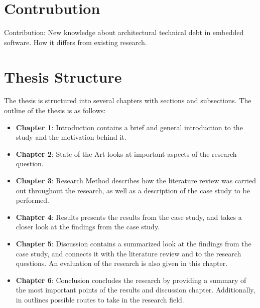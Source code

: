 \section{Contrubution}
Contribution: New knowledge about architectural technical debt in embedded software. How it differs from existing research.


\section{Thesis Structure}
The thesis is structured into several chapters with sections and subsections. The outline of the thesis is as follows:
\begin{itemize}
	\item{\textbf{Chapter 1}}: Introduction contains a brief and general introduction to the study and the motivation behind it.
	\item{\textbf{Chapter 2}}: State-of-the-Art looks at important aspects of the research question.
	\item{\textbf{Chapter 3}}: Research Method describes how the literature review was carried out throughout the research, as well as a description of the case study to be performed.
	\item{\textbf{Chapter 4}}: Results presents the results from the case study, and takes a closer look at the findings from the case study.
	\item{\textbf{Chapter 5}}: Discussion contains a summarized look at the findings from the case study, and connects it with the literature review and to the research questions. An evaluation of the research is also given in this chapter.
	\item{\textbf{Chapter 6}}: Conclusion concludes the research by providing a summary of the most important points of the results and discussion chapter. Additionally, in outlines possible routes to take in the research field.
\end{itemize}

